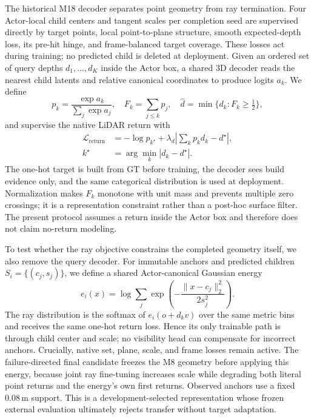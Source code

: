 The historical M18 decoder separates point geometry from ray termination. Four Actor-local child centers and tangent scales per completion seed are supervised directly by target points, local point-to-plane structure, smooth expected-depth loss, its pre-hit hinge, and frame-balanced target coverage. These losses act during training; no predicted child is deleted at deployment. Given an ordered set of query depths $d_1,\ldots,d_K$ inside the Actor box, a shared 3D decoder reads the nearest child latents and relative canonical coordinates to produce logits $a_k$. We define
\begin{equation}
p_k=\frac{\exp a_k}{\sum_j\exp a_j},\quad F_k=\sum_{j\le k}p_j,\quad
\widehat d=\min\{d_k:F_k\ge\tfrac12\},
\end{equation}
and supervise the native LiDAR return with
\begin{equation}
\begin{aligned}
\mathcal L_{\mathrm{return}}&=-\log p_{k^\star}
+\lambda_d\left|\sum_k p_kd_k-d^\star\right|,\\
k^\star&=\arg\min_k|d_k-d^\star|.
\end{aligned}
\end{equation}
The one-hot target is built from GT before training, the decoder sees build evidence only, and the same categorical distribution is used at deployment. Normalization makes $F_k$ monotone with unit mass and prevents multiple zero crossings; it is a representation constraint rather than a post-hoc surface filter. The present protocol assumes a return inside the Actor box and therefore does not claim no-return modeling.

To test whether the ray objective constrains the completed geometry itself, we also remove the query decoder. For immutable anchors and predicted children $S_i=\{(c_j,s_j)\}$, we define a shared Actor-canonical Gaussian energy
\begin{equation}
e_i(x)=\log\sum_j\exp\left(-\frac{\lVert x-c_j\rVert_2^2}{2s_j^2}\right).
\end{equation}
The ray distribution is the softmax of $e_i(o+d_kv)$ over the same metric bins and receives the same one-hot return loss. Hence its only trainable path is through child center and scale; no visibility head can compensate for incorrect anchors. Crucially, native set, plane, scale, and frame losses remain active. The failure-directed final candidate freezes the M8 geometry before applying this energy, because joint ray fine-tuning increases scale while degrading both literal point returns and the energy's own first returns. Observed anchors use a fixed $0.08$\,m support. This is a development-selected representation whose frozen external evaluation ultimately rejects transfer without target adaptation.


